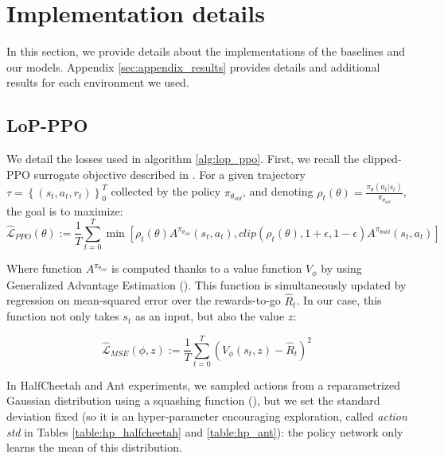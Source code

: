\newpage
\appendix

\section{Implementation details}
\label{sec:appendix_implementation}

  In this section, we provide details about the implementations of the baselines and our models. Appendix \ref{sec:appendix_results} provides details and additional results for each environment we used.

\subsection{LoP-PPO}
\label{subsec:lopppo}

We detail the losses used in algorithm \ref{alg:lop_ppo}. First, we recall the clipped-PPO surrogate objective described in \cite{ppo}. For a given trajectory $\tau=\left \{(s_t,a_t,r_t)\right \}_{0}^T$ collected by the policy $\pi_{\theta_{old}}$, and denoting $\rho_t\left ( \theta \right )=\frac{\pi_{\theta}(a_t|s_t)}{\pi_{\theta_{old}}}$, the goal is to maximize:
\begin{equation}
\widehat{\mathcal{L}}_{PPO} \left ( \theta \right ):=\frac{1}{T}\sum_{t=0}^{T}\min{\left [\rho_t\left ( \theta \right )A^{\pi_{\theta_{old}}}\left (s_t,a_t \right ), clip\left (\rho_t\left ( \theta \right ),1+\epsilon,1-\epsilon \right )A^{\pi_{\theta{old}}}\left (s_t,a_t \right ) \right ]}
\end{equation}

Where function $A^{\pi_{\theta_{old}}}$ is computed thanks to a value function $V_{\phi}$ by using Generalized Advantage Estimation (\cite{GAE}). This function is simultaneously updated by regression on mean-squared error over the rewards-to-go $\widehat{R}_t$. In our case, this function not only takes $s_t$ as an input, but also the value $z$:

\begin{equation}
\widehat{\mathcal{L}}_{MSE} \left ( \phi,z \right ):=\frac{1}{T}\sum_{t=0}^{T}\left ( V_{\phi}\left ( s_t,z \right )-\widehat{R}_t \right )^2
\end{equation}

In HalfCheetah and Ant experiments, we sampled actions from a reparametrized Gaussian distribution using a squashing function (\cite{squashing}), but we set the standard deviation fixed (so it is an hyper-parameter encouraging exploration, called \textit{action std} in Tables \ref{table:hp_halfcheetah} and \ref{table:hp_ant}): the policy network only learns the mean of this distribution. 


